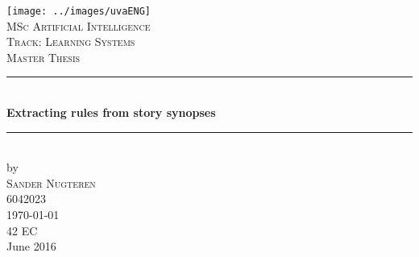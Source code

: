 \documentclass{article}
\begin{document}
\begin{titlepage}

\newcommand{\HRule}{\rule{\linewidth}{0.5mm}} %
\center %
 

\texttt{[image: ../images/uvaENG]}\\[2.5cm]
\textsc{\Large MSc Artificial Intelligence}\\[0.2cm]
\textsc{\normalsize Track: Learning Systems}\\[1.0cm] %
\textsc{\Large Master Thesis}\\[0.5cm] 


\HRule \\[0.4cm]
{ \huge \bfseries Extracting rules from story synopses}\\[0.4cm] %
\HRule \\[0.5cm]
 

by\\[0.2cm]
\textsc{\Large Sander Nugteren}\\[0.2cm] %
6042023\\[1cm]



{\Large \today}\\[1cm] %

42 EC\\ %
June 2016\\[1cm]%


\end{titlepage}
\end{document}
